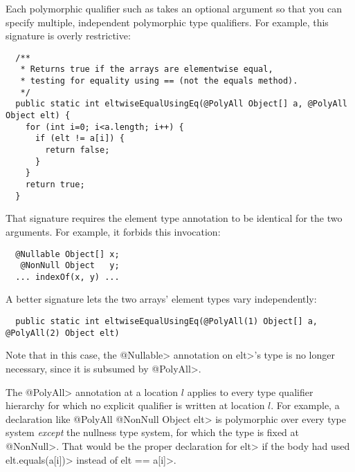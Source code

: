 
Each polymorphic qualifier such as 
takes an optional argument so that you can
specify multiple, independent polymorphic type qualifiers.  For example,
this signature is overly restrictive:

\begin{Verbatim}
  /**
   * Returns true if the arrays are elementwise equal,
   * testing for equality using == (not the equals method).
   */
  public static int eltwiseEqualUsingEq(@PolyAll Object[] a, @PolyAll Object elt) {
    for (int i=0; i<a.length; i++) {
      if (elt != a[i]) {
        return false;
      }
    }
    return true;
  }
\end{Verbatim}

\noindent
That signature requires the element type annotation to be identical for the
two arguments.  For example, it forbids this invocation:

\begin{Verbatim}
  @Nullable Object[] x;
   @NonNull Object   y;
  ... indexOf(x, y) ...
\end{Verbatim}

\noindent
A better signature lets the two arrays' element types vary independently:

\begin{Verbatim}
  public static int eltwiseEqualUsingEq(@PolyAll(1) Object[] a, @PolyAll(2) Object elt)
\end{Verbatim}

\noindent
Note that in this case, the \<@Nullable> annotation on \<elt>'s type is no
longer necessary, since it is subsumed by \<@PolyAll>.

The \<@PolyAll> annotation at a location $l$ applies to every type
qualifier hierarchy for which no explicit qualifier is written at location
$l$.  For example, a declaration like
\<@PolyAll @NonNull Object elt> is polymorphic over every type system
\emph{except} the nullness type system, for which the type is fixed at
\<@NonNull>.  That would be the proper declaration for \<elt> if the body
had used \<elt.equals(a[i])> instead of \<elt == a[i]>.



